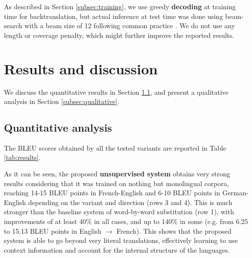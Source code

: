 \documentclass{article} \usepackage{iclr2018_conference,times}
\begin{document}
As described in Section \ref{subsec:training}, we use greedy \textbf{decoding} at training time for backtranslation, but actual inference at test time was done using beam-search with a beam size of 12 following common practice \citep{sutskever2014sequence,sennrich2016improving,sennrich2016neural,he2016dual}. We do not use any length or coverage penalty, which might further improve the reported results.


\section{Results and discussion} 
\label{sec:results}

We discuss the quantitative results in Section \ref{subsec:quantitative}, and present a qualitative analysis in Section \ref{subsec:qualitative}.

\subsection{Quantitative analysis} \label{subsec:quantitative}

The BLEU scores obtained by all the tested variants are reported in Table \ref{tab:results}.

As it can be seen, the proposed \textbf{unsupervised system} obtains very strong results considering that it was trained on nothing but monolingual corpora, reaching 14-15 BLEU points in French-English and 6-10 BLEU points in German-English depending on the variant and direction (rows 3 and 4). This is much stronger than the baseline system of word-by-word substitution (row 1), with improvements of at least 40\% in all cases, and up to 140\% in some (e.g. from 6.25 to 15.13 BLEU points in English $\rightarrow$ French). This shows that the proposed system is able to go beyond very literal translations, effectively learning to use context information and account for the internal structure of the languages.
\end{document}
